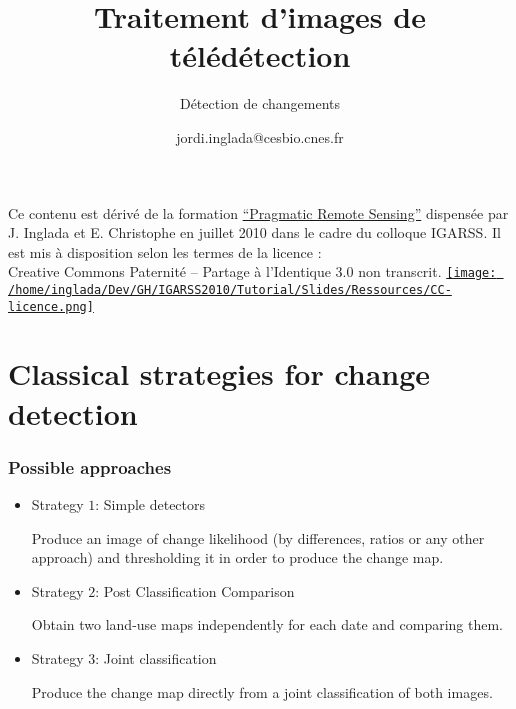 \documentclass[compress]{beamer}
\title{Traitement d'images de télédétection}
\subtitle{Détection de changements}
\author
{jordi.inglada@cesbio.cnes.fr}
\institute[Cesbio] %
{\textsc{Centre d'Études Spatiales de la Biosphère, Toulouse, France}}
\date{}
\begin{document}
\begin{frame}
  \titlepage
  \begin{center}
{\tiny Ce contenu est dérivé de la formation \href{http://www.orfeo-toolbox.org/packages/PragmaticRemoteSensing-handout.pdf}{``Pragmatic Remote
  Sensing''} dispensée par J. Inglada et E. Christophe en juillet 2010
  dans le cadre du colloque IGARSS. Il est mis à disposition selon les termes de la licence :\\
Creative Commons Paternité – Partage à l’Identique 3.0 non transcrit.} \href{http://creativecommons.org/licenses/by-sa/3.0/}{\texttt{[image: /home/inglada/Dev/GH/IGARSS2010/Tutorial/Slides/Ressources/CC-licence.png]}}    
  \end{center}
\end{frame}


\section[Strategies]{Classical strategies for change detection}

\begin{frame}
  \frametitle{Possible approaches}
\begin{itemize}

\item{Strategy $1$: Simple detectors}

Produce an image of change likelihood
(by differences, ratios or any other approach) and thresholding it in
order to produce the change map.

\item{Strategy $2$: Post Classification Comparison}

Obtain two
land-use maps independently for each date and comparing them. 


\item{Strategy $3$: Joint classification}

Produce the change map directly from a joint
classification of both images.


\end{itemize}
\end{frame}
\end{document}
